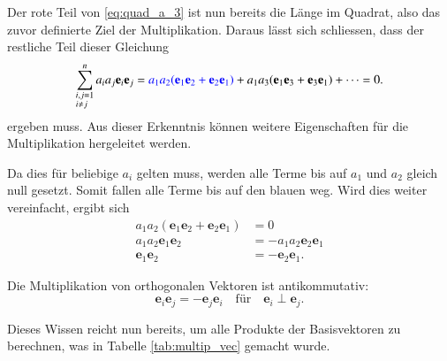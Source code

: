 Der rote Teil von \eqref{eq:quad_a_3} ist nun bereits die Länge im Quadrat, also das zuvor definierte Ziel der Multiplikation.
Daraus lässt sich schliessen, dass der restliche Teil dieser Gleichung
\begin{equation}
    \label{eq:Mischterme_Null}
    \sum_{\begin{subarray}{l}i,j=1\\i \neq j\end{subarray}}^n  a_ia_j\textbf{e}_i\textbf{e}_j  = \textcolor{blue}{a_1a_2(\textbf{e}_1\textbf{e}_2 + \textbf{e}_2\textbf{e}_1)} + a_1a_3(\textbf{e}_1\textbf{e}_3 + \textbf{e}_3\textbf{e}_1) + \dots =  0.
\end{equation}
 ergeben muss.
 Aus dieser Erkenntnis können weitere Eigenschaften für die Multiplikation hergeleitet werden.
 
Da dies für beliebige $a_i$ gelten muss, werden alle Terme bis auf $a_1$ und $a_2$ gleich null gesetzt.
Somit fallen alle Terme bis auf den blauen weg.
Wird dies weiter vereinfacht, ergibt sich
\begin{equation*}
\begin{aligned}
    a_1a_2(\textbf{e}_1\textbf{e}_2 + \textbf{e}_2\textbf{e}_1) &= 0 \\
    a_1a_2\textbf{e}_1\textbf{e}_2 &= -a_1a_2\textbf{e}_2\textbf{e}_1 \\
    \textbf{e}_1\textbf{e}_2 &= -\textbf{e}_2\textbf{e}_1.
\end{aligned}
\end{equation*}
\begin{satz}
  Die Multiplikation von orthogonalen Vektoren ist antikommutativ:
    \begin{equation*}
        \mathbf{e}_i\mathbf{e}_j = -\mathbf{e}_j\mathbf{e}_i \quad \textrm{für} \quad \mathbf{e}_i \perp \mathbf{e}_j.
    \end{equation*}
\end{satz}
Dieses Wissen reicht nun bereits, um alle Produkte der Basisvektoren zu berechnen, was in Tabelle \ref{tab:multip_vec} gemacht wurde.
